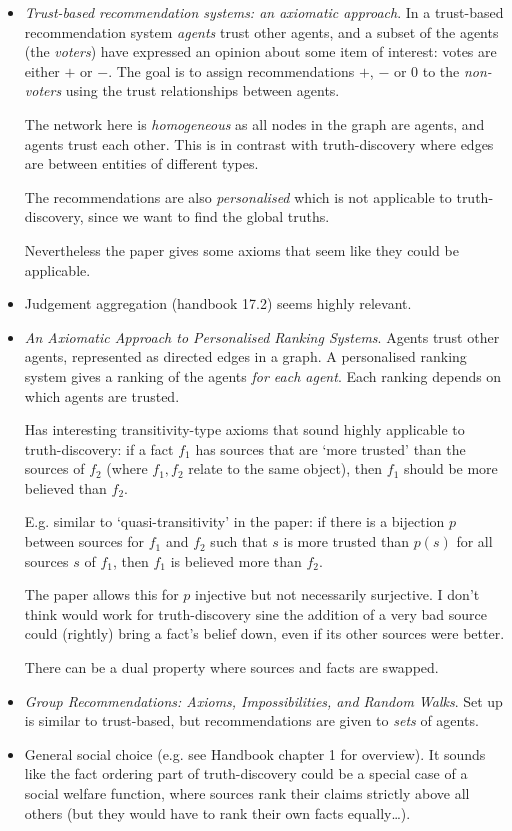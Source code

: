 \documentclass[../main.tex]{subfiles}
\begin{document}
\begin{itemize}

\item \emph{Trust-based recommendation systems: an axiomatic
approach}{\cite{andersen}}. In a trust-based recommendation system
\emph{agents} trust other agents, and a subset of the agents (the
\emph{voters}) have expressed an opinion about some item of interest: votes are
either $+$ or $-$. The goal is to assign recommendations $+$, $-$ or $0$ to the
\emph{non-voters} using the trust relationships between agents.

The network here is \emph{homogeneous} as all nodes in the graph are agents,
and agents trust each other. This is in contrast with truth-discovery where
edges are between entities of different types.

The recommendations are also \emph{personalised} which is not applicable to
truth-discovery, since we want to find the global truths.

Nevertheless the paper gives some axioms that seem like they could be
applicable.

\item Judgement aggregation (handbook 17.2) seems highly relevant.

\item \emph{An Axiomatic Approach to Personalised Ranking
Systems}{\cite{altman_personalised}}. Agents trust other agents, represented as
directed edges in a graph. A personalised ranking system gives a ranking of the
agents \emph{for each agent}. Each ranking depends on which agents are trusted.

Has interesting transitivity-type axioms that sound highly applicable to
truth-discovery: if a fact $f_1$ has sources that are `more trusted' than the
sources of $f_2$ (where $f_1, f_2$ relate to the same object), then $f_1$
should be more believed than $f_2$.

E.g. similar to `quasi-transitivity' in the paper: if there is a bijection $p$
between sources for $f_1$ and $f_2$ such that $s$ is more trusted than $p(s)$
for all sources $s$ of $f_1$, then $f_1$ is believed more than $f_2$.

The paper allows this for $p$ injective but not necessarily surjective. I don't
think would work for truth-discovery sine the addition of a very bad source
could (rightly) bring a fact's belief down, even if its other sources were
better.

There can be a dual property where sources and facts are swapped.

\item \emph{Group Recommendations: Axioms, Impossibilities, and Random
Walks}{\cite{lev}}. Set up is similar to trust-based, but recommendations are
given to \emph{sets} of agents.

\item General social choice (e.g. see Handbook chapter 1 for overview). It
sounds like the fact ordering part of truth-discovery could be a special case
of a social welfare function, where sources rank their claims strictly above
all others (but they would have to rank their own facts equally\ldots).

\end{itemize}
\end{document}
